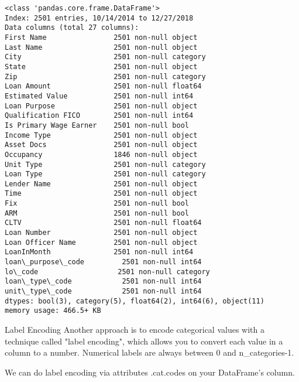\documentclass[11pt]{article}
\begin{document}
    \begin{Verbatim}[commandchars=\\\{\}]
<class 'pandas.core.frame.DataFrame'>
Index: 2501 entries, 10/14/2014 to 12/27/2018
Data columns (total 27 columns):
First Name                2501 non-null object
Last Name                 2501 non-null object
City                      2501 non-null category
State                     2501 non-null object
Zip                       2501 non-null category
Loan Amount               2501 non-null float64
Estimated Value           2501 non-null int64
Loan Purpose              2501 non-null object
Qualification FICO        2501 non-null int64
Is Primary Wage Earner    2501 non-null bool
Income Type               2501 non-null object
Asset Docs                2501 non-null object
Occupancy                 1846 non-null object
Unit Type                 2501 non-null category
Loan Type                 2501 non-null category
Lender Name               2501 non-null object
Time                      2501 non-null object
Fix                       2501 non-null bool
ARM                       2501 non-null bool
CLTV                      2501 non-null float64
Loan Number               2501 non-null object
Loan Officer Name         2501 non-null object
LoanInMonth               2501 non-null int64
loan\_purpose\_code         2501 non-null int64
lo\_code                   2501 non-null category
loan\_type\_code            2501 non-null int64
unit\_type\_code            2501 non-null int64
dtypes: bool(3), category(5), float64(2), int64(6), object(11)
memory usage: 466.5+ KB

    \end{Verbatim}

    Label Encoding Another approach is to encode categorical values with a
technique called "label encoding", which allows you to convert each
value in a column to a number. Numerical labels are always between 0 and
n\_categories-1.

We can do label encoding via attributes .cat.codes on your DataFrame's
column.
\end{document}
